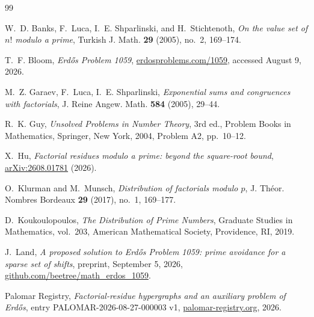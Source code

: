 \documentclass[11pt]{amsart}
\theoremstyle{definition}
\theoremstyle{remark}
\begin{document}
\begin{thebibliography}{99}

W.~D. Banks, F.~Luca, I.~E. Shparlinski, and H.~Stichtenoth,
\emph{On the value set of $n!$ modulo a prime},
Turkish J. Math. \textbf{29} (2005), no.~2, 169--174.

T.~F. Bloom,
\emph{Erd\H{o}s Problem 1059},
\href{https://www.erdosproblems.com/1059}
{erdosproblems.com/1059}, accessed August 9, 2026.

M.~Z. Garaev, F.~Luca, I.~E. Shparlinski,
\emph{Exponential sums and congruences with factorials},
J. Reine Angew. Math. \textbf{584} (2005), 29--44.

R.~K. Guy,
\emph{Unsolved Problems in Number Theory},
3rd ed., Problem Books in Mathematics, Springer, New York, 2004,
Problem A2, pp.~10--12.

X.~Hu,
\emph{Factorial residues modulo a prime: beyond the square-root bound},
\href{https://arxiv.org/abs/2608.01781}{arXiv:2608.01781} (2026).

O.~Klurman and M.~Munsch,
\emph{Distribution of factorials modulo $p$},
J. Th\'eor. Nombres Bordeaux \textbf{29} (2017), no.~1, 169--177.

D.~Koukoulopoulos,
\emph{The Distribution of Prime Numbers},
Graduate Studies in Mathematics, vol.~203,
American Mathematical Society, Providence, RI, 2019.

J.~Land,
\emph{A proposed solution to Erd\H{o}s Problem 1059: prime avoidance for a sparse set of shifts},
preprint, September 5, 2026,
\href{https://github.com/beetree/math_erdos_1059}
{github.com/beetree/math\_erdos\_1059}.

Palomar Registry,
\emph{Factorial-residue hypergraphs and an auxiliary problem of Erd\H{o}s},
entry PALOMAR-2026-08-27-000003 v1,
\href{https://palomar-registry.org/entry.html?id=PALOMAR-2026-08-27-000003&version=1}
{palomar-registry.org}, 2026.

\end{thebibliography}
\end{document}
